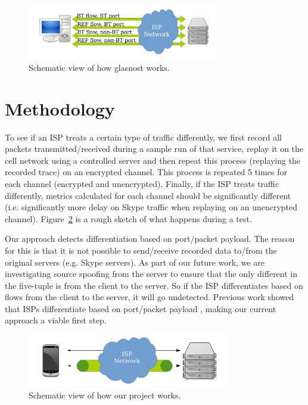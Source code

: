\documentclass[letterpaper]{sig-alternate-10pt}
\begin{document}
\begin{figure}[ht]
\centering
\includegraphics[width=3.3in]{figures/glasnost}
\caption{Schematic view of how glasnost works.}
\label{fig:glasnost}
\end{figure}


\section{Methodology}
\label{sec:method}

To see if an ISP treats a certain type of traffic differently, we first record all packets transmitted/received during a sample run of that service, replay it on the cell network using a controlled server and then repeat this process (replaying the recorded trace) on an encrypted channel. This process is repeated 5 times for each channel (encrypted and unencrypted). Finally, if the ISP treats traffic differently, metrics calculated for each channel should be significantly different (i.e. significantly more delay on 
Skype traffic when replaying on an unencrypted channel). Figure~\ref{fig:meddle} is a rough sketch of what happens during a test.

Our approach detects differentiation based on port/packet payload. The reason for this is that it is not possible to send/receive recorded data to/from the original servers (e.g. Skype servers). As part of our future work, we are investigating source spoofing from the server to ensure that the only different in the five-tuple is from the client to the server. So if the ISP differentiates based on flows from the client to the server, it will go undetected. Previous work showed that ISPs differentiate based on port/packet payload \cite{glasnost}, making our current approach a viable first step.

\begin{figure}[ht]
\centering
\includegraphics[width=3.5in]{figures/meddle}
\caption{Schematic view of how our project works.}
\label{fig:meddle}
\end{figure}
\end{document}
